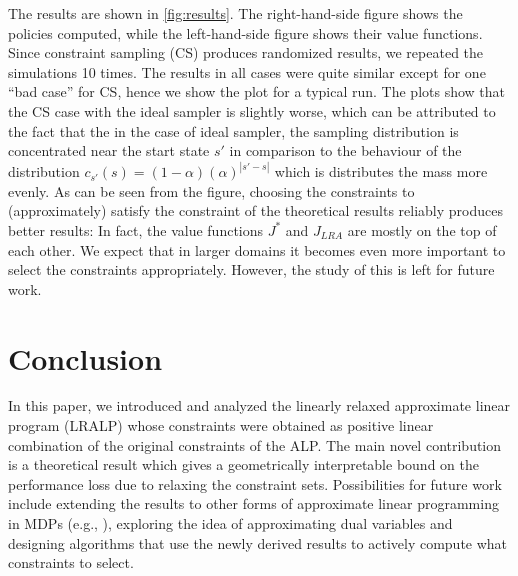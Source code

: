 \documentclass[12pt,draftcls,onecolumn]{IEEEtran}
\begin{document}
The results are shown in \cref{fig:results}.
The right-hand-side figure shows the policies computed,
while the left-hand-side figure shows their value functions.
Since constraint sampling (CS) produces randomized results,
we repeated the simulations 10 times.
The results in all cases were quite similar except for one ``bad case'' for CS, hence we show the plot for a typical run. The plots show that the CS case with the ideal sampler is slightly worse, which can be attributed to the fact that the in the case of ideal sampler, the sampling distribution is concentrated near the start state $s'$ in comparison to the behaviour of the distribution $c_{s'}(s)=(1-\alpha)(\alpha)^{|s'-s|}$ which is distributes the mass more evenly.
As can be seen from the figure, choosing the constraints to (approximately) satisfy the constraint of the theoretical results
reliably produces better results: In fact, the value functions $J^*$ and $J_{LRA}$ are mostly on the top of each other.
We expect that in larger domains it becomes even more important to select the constraints appropriately.
However, the study of this is left for future work.

\section{Conclusion}
In this paper, we introduced and analyzed the linearly relaxed approximate linear program (LRALP) whose constraints were obtained as positive linear combination of the original constraints of the ALP.
The main novel contribution is a theoretical result which gives a geometrically interpretable bound on the performance loss due to relaxing the constraint sets. Possibilities for future work include extending the results to other forms of approximate linear programming in MDPs (e.g., \citep{SALP}), exploring the idea of approximating dual variables and
designing algorithms that use the newly derived results to actively compute what constraints to select. 





\printbibliography
\newpage
\onecolumn
%
\end{document}
